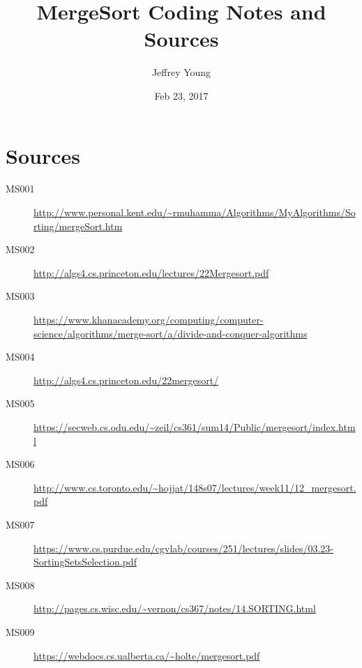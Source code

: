 \documentclass[10pt, letterpaper]{article}
\author{Jeffrey Young}
\date{Feb 23, 2017}
\title{MergeSort Coding Notes and Sources}
\begin{document}
\maketitle

\section*{Sources}
\label{sec:orgde14ac7}
\begin{description}
\item[{MS001}] \url{http://www.personal.kent.edu/\~rmuhamma/Algorithms/MyAlgorithms/Sorting/mergeSort.htm}
\item[{MS002}] \url{http://algs4.cs.princeton.edu/lectures/22Mergesort.pdf}
\item[{MS003}] \url{https://www.khanacademy.org/computing/computer-science/algorithms/merge-sort/a/divide-and-conquer-algorithms}
\item[{MS004}] \url{http://algs4.cs.princeton.edu/22mergesort/}
\item[{MS005}] \url{https://secweb.cs.odu.edu/\~zeil/cs361/sum14/Public/mergesort/index.html}
\item[{MS006}] \url{http://www.cs.toronto.edu/\~hojjat/148s07/lectures/week11/12\_mergesort.pdf}
\item[{MS007}] \url{https://www.cs.purdue.edu/cgvlab/courses/251/lectures/slides/03.23-SortingSetsSelection.pdf}
\item[{MS008}] \url{http://pages.cs.wisc.edu/\~vernon/cs367/notes/14.SORTING.html}
\item[{MS009}] \url{https://webdocs.cs.ualberta.ca/\~holte/mergesort.pdf}
\end{description}
\end{document}
